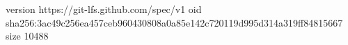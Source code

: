 version https://git-lfs.github.com/spec/v1
oid sha256:3ac49c256ea457ceb960430808a0a85e142c720119d995d314a319ff84815667
size 10488
